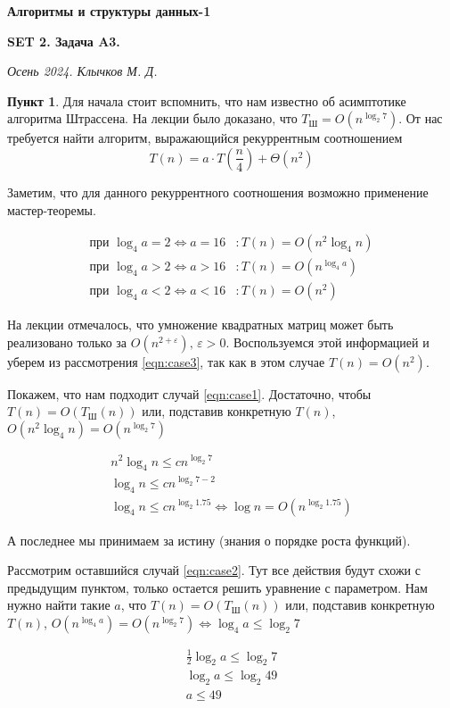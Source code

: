 \documentclass[11pt,a4paper]{scrarticle}
\author{Клычков Максим Дмитриевич}
\theoremstyle{definition}
\newtheorem{subtask}{Пункт}
\begin{document}
\centerline{\textbf{\huge Алгоритмы и структуры данных-1}}
\centerline{\textbf{SET 2. Задача A3.}}
\begin{flushright}
	\emph{Осень 2024. Клычков М. Д.}
\end{flushright}

\begin{subtask}
	Для начала стоит вспомнить, что нам известно об асимптотике алгоритма Штрассена. На лекции было доказано, что $T_\text{Ш} = O(n^{\log_2 7})$. От нас требуется найти алгоритм, выражающийся рекуррентным соотношением
	\begin{equation}
		\label{eqn:t}
		T(n) = a \cdot T\left(\frac{n}{4}\right) + \Theta(n^2)
	\end{equation}

	Заметим, что для данного рекуррентного соотношения возможно применение мастер-теоремы.

	\begin{align}
		\label{eqn:case1} \text{при } \log_4 a = 2 \Leftrightarrow a = 16 & \colon T(n) = O(n^2 \log_4 n) \\
		\label{eqn:case2} \text{при } \log_4 a > 2 \Leftrightarrow a > 16 & \colon T(n) = O(n^{\log_4 a}) \\
		\label{eqn:case3} \text{при } \log_4 a < 2 \Leftrightarrow a < 16 & \colon T(n) = O(n^2)
	\end{align}


	На лекции отмечалось, что умножение квадратных матриц может быть реализовано только за $O(n^{2+\varepsilon}), \, \varepsilon > 0$. Воспользуемся этой информацией и уберем из рассмотрения \eqref{eqn:case3}, так как в этом случае $T(n) = O(n^2)$.

	Покажем, что нам подходит случай \eqref{eqn:case1}. Достаточно, чтобы $T(n) = O(T_\text{Ш}(n))$ или, подставив конкретную $T(n)$, $O(n^2 \log_4 n) = O(n^{\log_2 7})$

	\begin{gather*}
		n^2 \log_4 n \leq c n^{\log_2 7} \\
		\log_4 n \leq c n^{\log_2 7 - 2} \\
		\log_4 n \leq c n^{\log_2 1.75} \Leftrightarrow \log n = O(n^{\log_2 1.75})
	\end{gather*}

	А последнее мы принимаем за истину (знания о порядке роста функций).

	Рассмотрим оставшийся случай \eqref{eqn:case2}. Тут все действия будут схожи с предыдущим пунктом, только остается решить уравнение с параметром.
	Нам нужно найти такие $a$, что $T(n) = O(T_\text{Ш}(n))$ или, подставив конкретную $T(n)$, $O(n^{\log_4 a}) = O(n^{\log_2 7}) \Leftrightarrow \log_4 a \leq \log_2 7$

	\begin{gather*}
		\frac{1}{2} \log_2 a \leq \log_2 7 \\
		\log_2 a \leq \log_2 49 \\
		a \leq 49
	\end{gather*}

\end{subtask}
\end{document}
